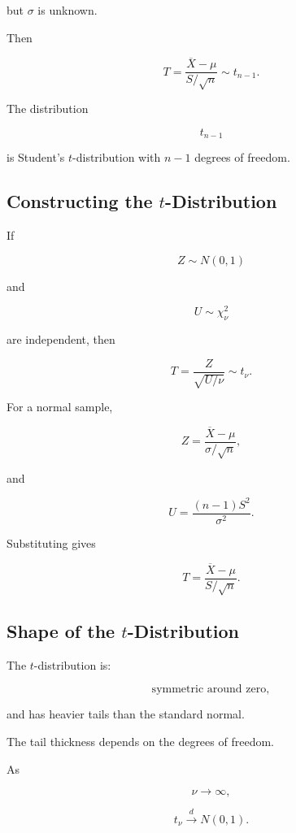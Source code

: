 but \(\sigma\) is unknown.

Then

\[
\boxed{
T
=
\frac{
\overline{X}-\mu
}{
S/\sqrt{n}
}
\sim
t_{n-1}.
}
\]

The distribution

\[
t_{n-1}
\]

is Student's \(t\)-distribution with \(n-1\) degrees of freedom.

\subsection{Constructing the \(t\)-Distribution}
\label{subsec:t-construction-sampling}

If

\[
Z\sim N(0,1)
\]

and

\[
U\sim\chi^2_\nu
\]

are independent, then

\[
\boxed{
T
=
\frac{
Z
}{
\sqrt{U/\nu}
}
\sim
t_\nu.
}
\]

For a normal sample,

\[
Z
=
\frac{
\overline{X}-\mu
}{
\sigma/\sqrt{n}
},
\]

and

\[
U
=
\frac{
(n-1)S^2
}{
\sigma^2
}.
\]

Substituting gives

\[
\boxed{
T
=
\frac{
\overline{X}-\mu
}{
S/\sqrt{n}
}.
}
\]

\subsection{Shape of the \(t\)-Distribution}
\label{subsec:t-distribution-shape}

The \(t\)-distribution is:

\[
\boxed{
\text{symmetric around zero},
}
\]

and has heavier tails than the standard normal.

The tail thickness depends on the degrees of freedom.

As

\[
\nu\to\infty,
\]

\[
\boxed{
t_\nu
\xrightarrow{d}
N(0,1).
}
\]

